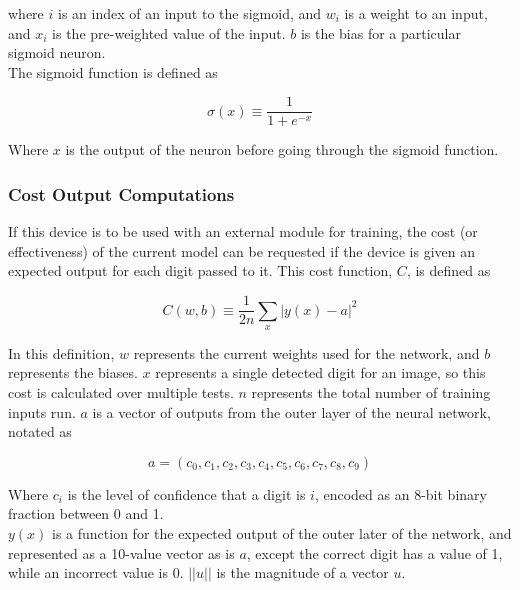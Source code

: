 \documentclass[12pt]{article}
\begin{document}
where $i$ is an index of an input to the sigmoid, and $w_i$ is a weight to an input, and $x_i$ is the pre-weighted value of the input. $b$ is the bias for a particular sigmoid neuron.\\

The sigmoid function is defined as

\begin{equation} \label{eq:sigmoid}
\sigma(x) \equiv \frac{1}{1+e^{-x}}
\end{equation}

Where $x$ is the output of the neuron before going through the sigmoid function.

\subsubsection{Cost Output Computations}

If this device is to be used with an external module for training, the cost (or effectiveness) of the current model can be requested if the device is given an expected output for each digit passed to it. This cost function, $C$, is defined as

\begin{equation} \label{eq:cost}
C(w,b) \equiv \frac{1}{2n}\sum_x |y(x) - a|^2
\end{equation}

In this definition, $w$ represents the current weights used for the network, and $b$ represents the biases. $x$ represents a single detected digit for an image, so this cost is calculated over multiple tests. $n$ represents the total number of training inputs run. $a$ is a vector of outputs from the outer layer of the neural network, notated as

\begin{equation}\label{eq:output-vector}
a = (c_0,c_1,c_2,c_3,c_4,c_5,c_6,c_7,c_8,c_9)
\end{equation}

Where $c_i$ is the level of confidence that a digit is $i$, encoded as an 8-bit binary fraction between 0 and 1.\\

$y(x)$ is a function for the expected output of the outer later of the network, and represented as a 10-value vector as is $a$, except the correct digit has a value of 1, while an incorrect value is 0. $||u||$ is the magnitude of a vector $u$.
\end{document}

